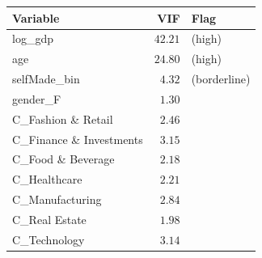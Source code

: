 \begin{tabular}{lrl}
\toprule
Variable & VIF & Flag \\
\midrule
log\_gdp & $42.21$ &  (high) \\
age & $24.80$ &  (high) \\
selfMade\_bin & $4.32$ &  (borderline) \\
gender\_F & $1.30$ &  \\
C\_Fashion \& Retail & $2.46$ &  \\
C\_Finance \& Investments & $3.15$ &  \\
C\_Food \& Beverage & $2.18$ &  \\
C\_Healthcare & $2.21$ &  \\
C\_Manufacturing & $2.84$ &  \\
C\_Real Estate & $1.98$ &  \\
C\_Technology & $3.14$ &  \\
\bottomrule
\end{tabular}

